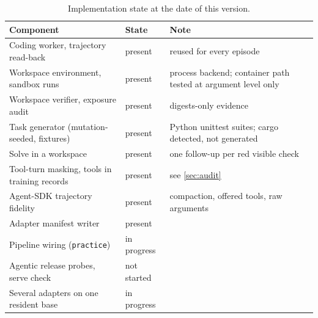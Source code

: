 \begin{table}[t]
\centering\small
\begin{tabular}{p{4.6cm}p{2.4cm}p{6.2cm}}
\toprule
Component & State & Note \\
\midrule
Coding worker, trajectory read-back & present & reused for every episode \\
Workspace environment, sandbox runs & present & process backend; container path tested at argument level only \\
Workspace verifier, exposure audit & present & digests-only evidence \\
Task generator (mutation-seeded, fixtures) & present & Python unittest suites; cargo detected, not generated \\
Solve in a workspace & present & one follow-up per red visible check \\
Tool-turn masking, tools in training records & present & see \cref{sec:audit} \\
Agent-SDK trajectory fidelity & present & compaction, offered tools, raw arguments \\
Adapter manifest writer & present & \\
Pipeline wiring (\texttt{practice}) & in progress & \\
Agentic release probes, serve check & not started & \\
Several adapters on one resident base & in progress & \\
\bottomrule
\end{tabular}
\caption{Implementation state at the date of this version.}\label{tab:state}
\end{table}
